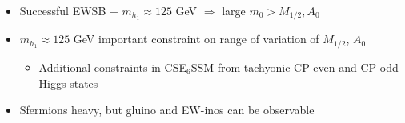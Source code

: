 \documentclass[10pt,aspectratio=169]{beamer}
\begin{document}
\begin{frame}
\begin{columns}[t]
\begin{column}{0.7\textwidth}
\begin{columns}[t]
\begin{column}{0.5\textwidth}
\begin{figure}
          \end{figure}
        \end{column}
      \end{columns}
      \begin{itemize}
      \item Successful EWSB $+$ $m_{h_1} \approx 125$ GeV $\Rightarrow$
        large $m_0 > M_{1/2}, A_0$
      \item \alert{$m_{h_1} \approx 125$ GeV important constraint on
        range of variation of $M_{1/2}$, $A_0$}
        \begin{itemize}
        \item Additional constraints in CSE$_6$SSM from tachyonic
          CP-even and CP-odd Higgs states
        \end{itemize}
      \item Sfermions heavy, but gluino and EW-inos
        can be observable
      \end{itemize}
    \end{column}
  \end{columns}
\end{frame}
\end{document}
